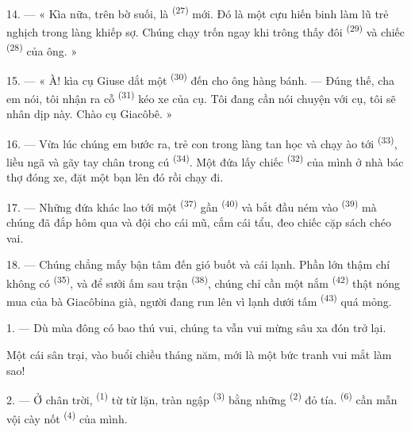 14. --- « Kìa nữa, trên bờ suối, là  \textsuperscript{(27)} mới.
Đó là một cựu hiến binh làm lũ trẻ nghịch trong làng khiếp sợ. Chúng chạy trốn ngay khi
trông thấy đôi  \textsuperscript{(29)} và chiếc 
\textsuperscript{(28)} của ông. »

15. --- « À! kìa cụ Giuse dắt một  \textsuperscript{(30)} đến cho ông
hàng bánh. --- Đúng thế, cha em nói, tôi nhận ra cỗ  \textsuperscript{(31)}
kéo xe của cụ. Tôi đang cần nói chuyện với cụ, tôi sẽ nhân dịp này. Chào cụ Giacôbê. »

16. --- Vừa lúc chúng em bước ra, trẻ con trong làng tan học và chạy ào tới  \textsuperscript{(33)}, liều ngã và gãy tay chân trong cú 
\textsuperscript{(34)}. Một đứa lấy chiếc 
\textsuperscript{(32)} của mình ở nhà bác thợ đóng xe, đặt một bạn lên đó rồi chạy đi.

17. --- Những đứa khác lao tới một  \textsuperscript{(37)} gần
 \textsuperscript{(40)} và bắt đầu ném vào 
\textsuperscript{(39)} mà chúng đã đắp hôm qua và đội cho cái mũ, cắm cái tẩu, đeo chiếc
cặp sách chéo vai.

18. --- Chúng chẳng mấy bận tâm đến gió buốt và cái lạnh. Phần lớn thậm chí không có
 \textsuperscript{(35)}, và để sưởi ấm sau trận  \textsuperscript{(38)}, chúng chỉ cần một nắm 
\textsuperscript{(42)} thật nóng mua của bà  Giacôbina già, người đang run
lên vì lạnh dưới tấm  \textsuperscript{(43)} quá mỏng.

\VUsaut{3.0mm}
\VUsaut{3.0mm}

\VUsaut{4.0mm}

1. --- Dù mùa đông có bao thú vui, chúng ta vẫn vui mừng sâu xa đón 
trở lại.

Một cái sân trại, vào buổi chiều tháng năm, mới là một bức tranh vui mắt làm sao!

2. --- Ở chân trời,  \textsuperscript{(1)} từ từ lặn, tràn ngập
 \textsuperscript{(3)} bằng những 
\textsuperscript{(2)} đỏ tía.  \textsuperscript{(6)} cần mẫn vội
cày nốt  \textsuperscript{(4)} của mình.

